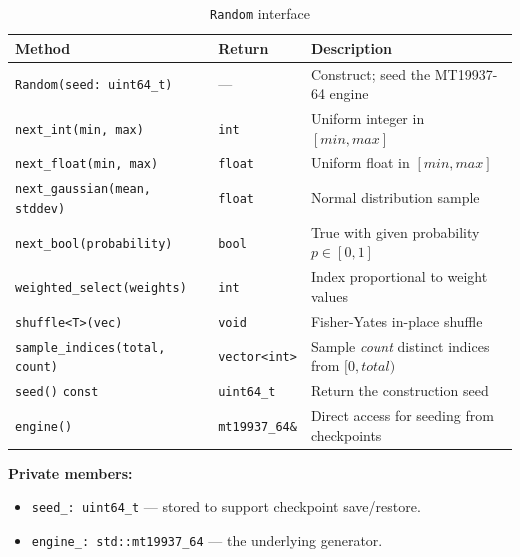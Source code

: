 \begin{table}[H]
\centering\small
\caption{\texttt{Random} interface}
\begin{tabularx}{\textwidth}{@{}llX@{}}
\toprule
\textbf{Method} & \textbf{Return} & \textbf{Description} \\
\midrule
\texttt{Random(seed: uint64\_t)} & — & Construct; seed the MT19937-64 engine \\
\texttt{next\_int(min, max)} & \texttt{int} & Uniform integer in $[\mathit{min}, \mathit{max}]$ \\
\texttt{next\_float(min, max)} & \texttt{float} & Uniform float in $[\mathit{min}, \mathit{max}]$ \\
\texttt{next\_gaussian(mean, stddev)} & \texttt{float} & Normal distribution sample \\
\texttt{next\_bool(probability)} & \texttt{bool} & True with given probability $p\in[0,1]$ \\
\texttt{weighted\_select(weights)} & \texttt{int} & Index proportional to weight values \\
\texttt{shuffle<T>(vec)} & \texttt{void} & Fisher-Yates in-place shuffle \\
\texttt{sample\_indices(total, count)} & \texttt{vector<int>} & Sample \emph{count} distinct indices from $[0,\mathit{total})$ \\
\texttt{seed()} \texttt{const} & \texttt{uint64\_t} & Return the construction seed \\
\texttt{engine()} & \texttt{mt19937\_64\&} & Direct access for seeding from checkpoints \\
\bottomrule
\end{tabularx}
\end{table}

\textbf{Private members:}
\begin{itemize}[nosep]
  \item \texttt{seed\_: uint64\_t} — stored to support checkpoint save/restore.
  \item \texttt{engine\_: std::mt19937\_64} — the underlying generator.
\end{itemize}
